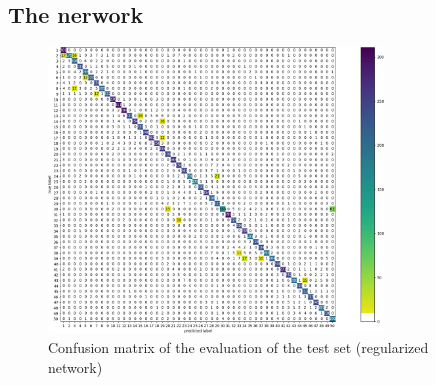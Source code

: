 \documentclass[compsoc]{IEEEtran}
\begin{document}
\subsection{The nerwork}



\begin{figure}[ht!]
\centering                                                                        
\includegraphics[width=3.5in]{regcm.png}
\captionsetup{justification=centering}
\caption{Confusion matrix of the evaluation of the test set (regularized network)}
\label{fig:regcm}
\end{figure}
\end{document}
